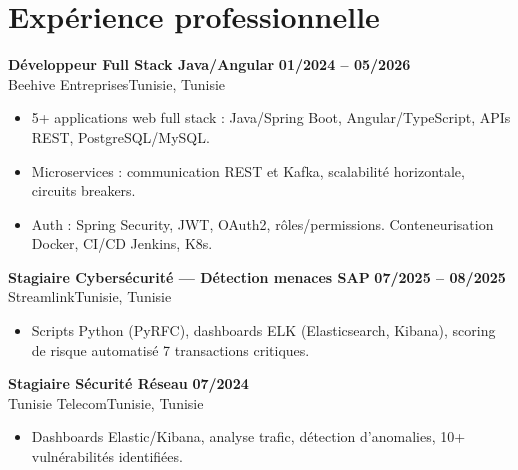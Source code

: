 \documentclass[a4paper,10pt]{article}
\newcommand{\cventry}[4]{\textbf{#1} \hfill \textbf{#4}\\[0.5pt]#2{\ifx\relax#3\relax\else, #3\fi}\par\vspace{1pt}}
\begin{document}
\section{Expérience professionnelle}
\cventry{Développeur Full Stack Java/Angular}{Beehive Entreprises}{Tunisie}{01/2024 -- 05/2026}
\begin{itemize}
  \item 5+ applications web full stack : Java/Spring Boot, Angular/TypeScript, APIs REST, PostgreSQL/MySQL.
  \item Microservices : communication REST et Kafka, scalabilité horizontale, circuits breakers.
  \item Auth : Spring Security, JWT, OAuth2, rôles/permissions. Conteneurisation Docker, CI/CD Jenkins, K8s.
\end{itemize}
\cventry{Stagiaire Cybersécurité --- Détection menaces SAP}{Streamlink}{Tunisie}{07/2025 -- 08/2025}
\begin{itemize}
  \item Scripts Python (PyRFC), dashboards ELK (Elasticsearch, Kibana), scoring de risque automatisé 7 transactions critiques.
\end{itemize}
\cventry{Stagiaire Sécurité Réseau}{Tunisie Telecom}{Tunisie}{07/2024}
\begin{itemize}
  \item Dashboards Elastic/Kibana, analyse trafic, détection d'anomalies, 10+ vulnérabilités identifiées.
\end{itemize}
\end{document}
